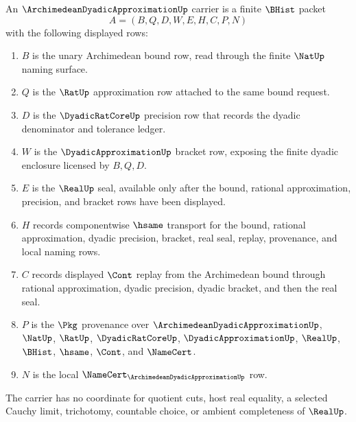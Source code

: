\begin{definition}
\label{def:archimedean-dyadic-approximation-carrier}
An $\ArchimedeanDyadicApproximationUp$ carrier is a finite $\BHist$ packet
$$
A=(B,Q,D,W,E,H,C,P,N)
$$
with the following displayed rows:
\begin{enumerate}
\item $B$ is the unary Archimedean bound row, read through the finite $\NatUp$ naming surface.
\item $Q$ is the $\RatUp$ approximation row attached to the same bound request.
\item $D$ is the $\DyadicRatCoreUp$ precision row that records the dyadic denominator and tolerance ledger.
\item $W$ is the $\DyadicApproximationUp$ bracket row, exposing the finite dyadic enclosure licensed by $B,Q,D$.
\item $E$ is the $\RealUp$ seal, available only after the bound, rational approximation, precision, and bracket rows have been displayed.
\item $H$ records componentwise $\hsame$ transport for the bound, rational approximation, dyadic precision, bracket, real seal, replay, provenance, and local naming rows.
\item $C$ records displayed $\Cont$ replay from the Archimedean bound through rational approximation, dyadic precision, dyadic bracket, and then the real seal.
\item $P$ is the $\Pkg$ provenance over $\ArchimedeanDyadicApproximationUp$, $\NatUp$, $\RatUp$, $\DyadicRatCoreUp$, $\DyadicApproximationUp$, $\RealUp$, $\BHist$, $\hsame$, $\Cont$, and $\NameCert$.
\item $N$ is the local $\NameCert_{\ArchimedeanDyadicApproximationUp}$ row.
\end{enumerate}
The carrier has no coordinate for quotient cuts, host real equality, a selected Cauchy limit, trichotomy, countable choice, or ambient completeness of $\RealUp$.
\end{definition}

